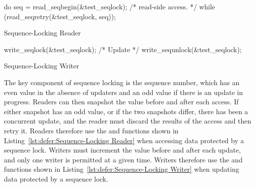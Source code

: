 \QuickQuizEnd

\begin{listing}[bp]
\begin{VerbatimL}
do {
	seq = read_seqbegin(&test_seqlock);
	/* read-side access. */
} while (read_seqretry(&test_seqlock, seq));
\end{VerbatimL}
\caption{Sequence-Locking Reader}
\label{lst:defer:Sequence-Locking Reader}
\end{listing}

\begin{listing}[bp]
\begin{VerbatimL}
write_seqlock(&test_seqlock);
/* Update */
write_sequnlock(&test_seqlock);
\end{VerbatimL}
\caption{Sequence-Locking Writer}
\label{lst:defer:Sequence-Locking Writer}
\end{listing}

The key component of sequence locking is the sequence number, which has
an even value in the absence of updaters and an odd value if there
is an update in progress.
Readers can then snapshot the value before and after each access.
If either snapshot has an odd value, or if the two snapshots differ,
there has been a concurrent update, and the reader must discard
the results of the access and then retry it.
Readers therefore use the  and 
functions shown in Listing~\ref{lst:defer:Sequence-Locking Reader}
when accessing data protected by a sequence lock.
Writers must increment the value before and after each update,
and only one writer is permitted at a given time.
Writers therefore use the  and 
functions shown in Listing~\ref{lst:defer:Sequence-Locking Writer}
when updating data protected by a sequence lock.

